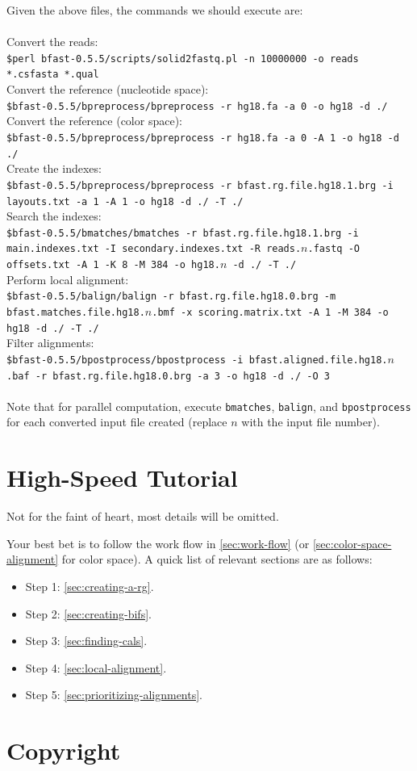 \documentclass[a4paper,12pt]{book}
\newcommand{\Version}{0.5.5}
\begin{document}
Given the above files, the commands we should execute are:
\\\\
Convert the reads:\\
{\tt \scriptsize \$perl bfast-\Version{}/scripts/solid2fastq.pl -n 10000000 -o reads *.csfasta *.qual\\}
Convert the reference (nucleotide space):\\
{\tt \scriptsize \$bfast-\Version{}/bpreprocess/bpreprocess -r hg18.fa -a 0 -o hg18 -d ./\\}
Convert the reference (color space):\\
{\tt \scriptsize \$bfast-\Version{}/bpreprocess/bpreprocess -r hg18.fa -a 0 -A 1 -o hg18 -d ./\\}
Create the indexes:\\
{\tt \scriptsize \$bfast-\Version{}/bpreprocess/bpreprocess -r bfast.rg.file.hg18.1.brg -i layouts.txt -a 1 -A 1 -o hg18 -d ./ -T ./\\}
Search the indexes:\\
{\tt \scriptsize \$bfast-\Version{}/bmatches/bmatches -r bfast.rg.file.hg18.1.brg -i main.indexes.txt -I secondary.indexes.txt -R reads.$n$.fastq -O offsets.txt -A 1 -K 8 -M 384 -o hg18.$n$ -d ./ -T ./\\}
Perform local alignment:\\
{\tt \scriptsize \$bfast-\Version{}/balign/balign -r bfast.rg.file.hg18.0.brg -m bfast.matches.file.hg18.$n$.bmf -x scoring.matrix.txt -A 1 -M 384 -o hg18 -d ./ -T ./\\}
Filter alignments:\\
{\tt \scriptsize \$bfast-\Version{}/bpostprocess/bpostprocess -i bfast.aligned.file.hg18.$n$.baf -r bfast.rg.file.hg18.0.brg -a 3 -o hg18 -d ./ -O 3\\}
\\
Note that for parallel computation, execute {\tt bmatches}, {\tt balign}, and {\tt bpostprocess} for each converted input file created (replace $n$ with the input file number).

\section{High-Speed Tutorial}
\label{sec:high-speed-tutorial}
Not for the faint of heart, most details will be omitted.

Your best bet is to follow the work flow in \autoref{sec:work-flow} (or \autoref{sec:color-space-alignment} for color space).
A quick list of relevant sections are as follows:
\begin{itemize}
	\item Step 1: \autoref{sec:creating-a-rg}.
	\item Step 2: \autoref{sec:creating-bifs}.
	\item Step 3: \autoref{sec:finding-cals}.
	\item Step 4: \autoref{sec:local-alignment}.
	\item Step 5: \autoref{sec:prioritizing-alignments}.
\end{itemize}
\section{Copyright}


{}


\end{document}
